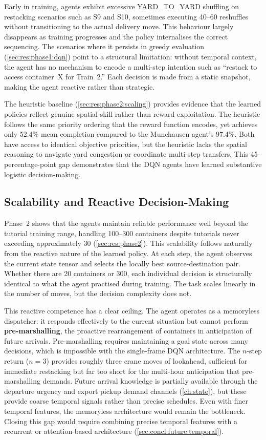 Early in training, agents exhibit excessive YARD\_TO\_YARD shuffling on restacking scenarios such as S9 and S10, sometimes executing 40--60 reshuffles without transitioning to the actual delivery move. This behaviour largely disappears as training progresses and the policy internalises the correct sequencing. The scenarios where it persists in greedy evaluation (\cref{sec:res:phase1:dqn}) point to a structural limitation: without temporal context, the agent has no mechanism to encode a multi-step intention such as ``restack to access container~X for Train~2.'' Each decision is made from a static snapshot, making the agent reactive rather than strategic.

The heuristic baseline (\cref{sec:res:phase2:scaling}) provides evidence that the learned policies reflect genuine spatial skill rather than reward exploitation. The heuristic follows the same priority ordering that the reward function encodes, yet achieves only 52.4\% mean completion compared to the Munchausen agent's 97.4\%. Both have access to identical objective priorities, but the heuristic lacks the spatial reasoning to navigate yard congestion or coordinate multi-step transfers. This 45-percentage-point gap demonstrates that the DQN agents have learned substantive logistic decision-making.

\subsection{Scalability and Reactive Decision-Making}
\label{sec:disc:interpretation:scalability}

Phase~2 shows that the agents maintain reliable performance well beyond the tutorial training range, handling 100--300 containers despite tutorials never exceeding approximately 30 (\cref{sec:res:phase2}). This scalability follows naturally from the reactive nature of the learned policy. At each step, the agent observes the current state tensor and selects the locally best source-destination pair. Whether there are 20 containers or 300, each individual decision is structurally identical to what the agent practised during training. The task scales linearly in the number of moves, but the decision complexity does not.

This reactive competence has a clear ceiling. The agent operates as a memoryless dispatcher: it responds effectively to the current situation but cannot perform \textbf{pre-marshalling}, the proactive rearrangement of containers in anticipation of future arrivals. Pre-marshalling requires maintaining a goal state across many decisions, which is impossible with the single-frame DQN architecture. The $n$-step return ($n = 3$) provides roughly three crane moves of lookahead, sufficient for immediate restacking but far too short for the multi-hour anticipation that pre-marshalling demands. Future arrival knowledge is partially available through the departure urgency and export pickup demand channels (\cref{ch:state}), but these provide coarse temporal signals rather than precise schedules. Even with finer temporal features, the memoryless architecture would remain the bottleneck. Closing this gap would require combining precise temporal features with a recurrent or attention-based architecture (\cref{sec:concl:future:temporal}).

